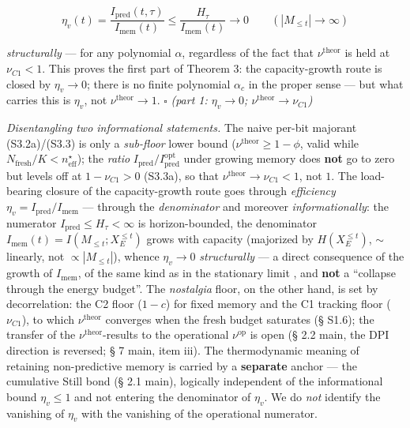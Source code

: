 \documentclass[12pt]{iopart}
\begin{document}
\[\eta_v(t) = \frac{I_{\text{pred}}(t,\tau)}{I_{\text{mem}}(t)} \le \frac{H_\tau}{I_{\text{mem}}(t)} \to 0 \qquad (|M_{\le t}| \to \infty)\]



\emph{structurally} --- for any polynomial \(\alpha\), regardless of the fact that \(\nu^{\text{theor}}\) is held at \(\nu_{C1} < 1\). This proves the first part of Theorem 3: the capacity-growth route is closed by \(\eta_v \to 0\); there is no finite polynomial \(\alpha_c\) in the proper sense --- but what carries this is \(\eta_v\), not \(\nu^{\text{theor}} \to 1\). \(\square\) \emph{(part 1: \(\eta_v \to 0\); \(\nu^{\text{theor}} \to \nu_{C1}\))}



\emph{Disentangling two informational statements.} The naive per-bit majorant (S3.2a)/(S3.3) is only a \emph{sub-floor} lower bound (\(\nu^{\text{theor}} \ge 1-\phi\), valid while \(N_{\text{fresh}}/K < n_{\text{eff}}^\star\)); the \emph{ratio} \(I_{\text{pred}}/I_{\text{pred}}^{\text{opt}}\) under growing memory does \textbf{not} go to zero but levels off at \(1-\nu_{C1} > 0\) (S3.3a), so that \(\nu^{\text{theor}} \to \nu_{C1} < 1\), not \(1\). The load-bearing closure of the capacity-growth route goes through \emph{efficiency} \(\eta_v = I_{\text{pred}}/I_{\text{mem}}\) --- through the \emph{denominator} and moreover \emph{informationally}: the numerator \(I_{\text{pred}} \le H_\tau < \infty\) is horizon-bounded, the denominator \(I_{\text{mem}}(t) = I(M_{\le t}; X_E^{\le t})\) grows with capacity (majorized by \(H(X_E^{\le t})\), \(\sim\)linearly, not \(\propto |M_{\le t}|\)), whence \(\eta_v \to 0\) \emph{structurally} --- a direct consequence of the growth of \(I_{\text{mem}}\), of the same kind as in the stationary limit \cite{Andriishin2026b}, and \textbf{not} a ``collapse through the energy budget''. The \emph{nostalgia} floor, on the other hand, is set by decorrelation: the C2 floor (\(1-c\)) for fixed memory and the C1 tracking floor (\(\nu_{C1}\)), to which \(\nu^{\text{theor}}\) converges when the fresh budget saturates (§ S1.6); the transfer of the \(\nu^{\text{theor}}\)-results to the operational \(\nu^{\text{op}}\) is open (§ 2.2 main, the DPI direction is reversed; § 7 main, item iii). The thermodynamic meaning of retaining non-predictive memory is carried by a \textbf{separate} anchor --- the cumulative Still bond (§ 2.1 main), logically independent of the informational bound \(\eta_v \le 1\) and not entering the denominator of \(\eta_v\). We do \emph{not} identify the vanishing of \(\eta_v\) with the vanishing of the operational numerator.
\end{document}
